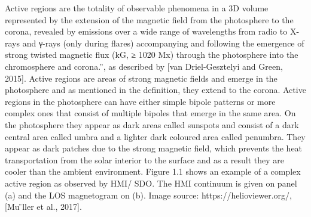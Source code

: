 Active regions are the totality of observable phenomena in a 3D volume represented by the extension of the magnetic field from the photosphere to the corona, revealed by emissions over a wide range of wavelengths from radio to X-rays and γ-rays (only during flares) accompanying and following the emergence of strong twisted magnetic flux (kG, ≥ 1020 Mx) through the photosphere into the chromosphere and corona.”, as described by [van Driel-Gesztelyi and Green, 2015]. Active regions are areas of strong magnetic fields and emerge in the photosphere and as mentioned in the definition, they extend to the corona. Active regions in the photosphere can have either simple bipole patterns or more complex ones that consist of multiple bipoles that emerge in the same area. On the photosphere they appear as dark areas called sunspots and consist of a dark central area called umbra and a lighter dark coloured area called penumbra. They appear as dark patches due to the strong magnetic field, which prevents the heat transportation from the solar interior to the surface and as a result they are cooler than the ambient environment. Figure 1.1 shows an example of a complex active region as observed by HMI/ SDO. The HMI continuum is given on panel (a) and the LOS magnetogram on (b). Image source: https://helioviewer.org/, [Mu ̈ller et al., 2017].

